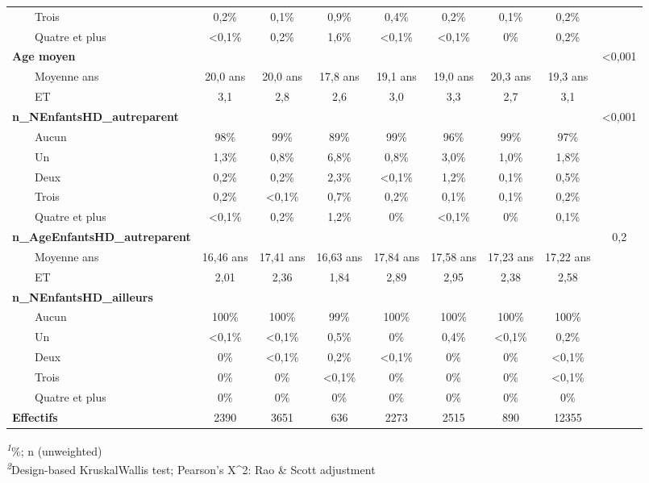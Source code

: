 \documentclass[
  12pt,
]{book}
\begin{document}
\begin{longtable}{lcccccccc}
    Trois & 0,2\% & 0,1\% & 0,9\% & 0,4\% & 0,2\% & 0,1\% & 0,2\% &  \\ 
    Quatre et plus & <0,1\% & 0,2\% & 1,6\% & <0,1\% & <0,1\% & 0\% & 0,2\% &  \\ 
{\bfseries Age moyen} &  &  &  &  &  &  &  & <0,001 \\ 
    Moyenne ans & 20,0 ans & 20,0 ans & 17,8 ans & 19,1 ans & 19,0 ans & 20,3 ans & 19,3 ans &  \\ 
    ET & 3,1 & 2,8 & 2,6 & 3,0 & 3,3 & 2,7 & 3,1 &  \\ 
{\bfseries n\_NEnfantsHD\_autreparent} &  &  &  &  &  &  &  & <0,001 \\ 
    Aucun & 98\% & 99\% & 89\% & 99\% & 96\% & 99\% & 97\% &  \\ 
    Un & 1,3\% & 0,8\% & 6,8\% & 0,8\% & 3,0\% & 1,0\% & 1,8\% &  \\ 
    Deux & 0,2\% & 0,2\% & 2,3\% & <0,1\% & 1,2\% & 0,1\% & 0,5\% &  \\ 
    Trois & 0,2\% & <0,1\% & 0,7\% & 0,2\% & 0,1\% & 0,1\% & 0,2\% &  \\ 
    Quatre et plus & <0,1\% & 0,2\% & 1,2\% & 0\% & <0,1\% & 0\% & 0,1\% &  \\ 
{\bfseries n\_AgeEnfantsHD\_autreparent} &  &  &  &  &  &  &  & 0,2 \\ 
    Moyenne ans & 16,46 ans & 17,41 ans & 16,63 ans & 17,84 ans & 17,58 ans & 17,23 ans & 17,22 ans &  \\ 
    ET & 2,01 & 2,36 & 1,84 & 2,89 & 2,95 & 2,38 & 2,58 &  \\ 
{\bfseries n\_NEnfantsHD\_ailleurs} &  &  &  &  &  &  &  &  \\ 
    Aucun & 100\% & 100\% & 99\% & 100\% & 100\% & 100\% & 100\% &  \\ 
    Un & <0,1\% & <0,1\% & 0,5\% & 0\% & 0,4\% & <0,1\% & 0,2\% &  \\ 
    Deux & 0\% & <0,1\% & 0,2\% & <0,1\% & 0\% & 0\% & <0,1\% &  \\ 
    Trois & 0\% & 0\% & <0,1\% & 0\% & 0\% & 0\% & <0,1\% &  \\ 
    Quatre et plus & 0\% & 0\% & 0\% & 0\% & 0\% & 0\% & 0\% &  \\ 
{\bfseries Effectifs} & 2390 & 3651 & 636 & 2273 & 2515 & 890 & 12355 &  \\ 
\bottomrule
\end{longtable}
\begin{minipage}{\linewidth}
\textsuperscript{\textit{1}}\%; n (unweighted)\\
\textsuperscript{\textit{2}}Design-based KruskalWallis test; Pearson's X\^{}2: Rao \& Scott adjustment\\
\end{minipage}
\endgroup
\end{document}
